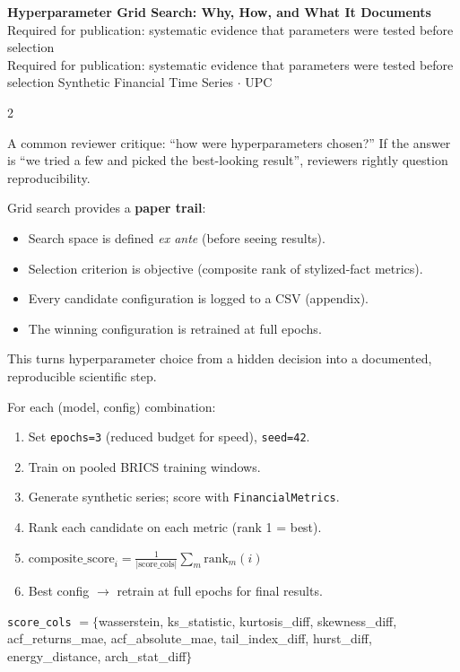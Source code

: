 \documentclass[10pt]{article}
\newcommand{\navybox}[2]{\begin{tcolorbox}[mybox={Navy}{LBg},title={#1}]#2\end{tcolorbox}}
\newcommand{\skybox}[2]{\begin{tcolorbox}[mybox={Sky}{BBg},title={#1}]#2\end{tcolorbox}}
\newcommand{\tealbox}[2]{\begin{tcolorbox}[mybox={Teal}{LBg},title={#1}]#2\end{tcolorbox}}
\newcommand{\pagehead}[2]{%
  \begin{tcolorbox}[enhanced,arc=0pt,outer arc=0pt,boxrule=0pt,
    colback=Navy,colframe=Navy,
    top=5pt,bottom=5pt,left=8pt,right=8pt,
    before skip=0pt,after skip=10pt]
  {\color{white}\large\bfseries #1}%
  \ifx\relax#2\relax\else\\[1pt]{\color{blue!30!white}\small #2}\fi
  \hfill{\color{blue!20!white}\footnotesize Synthetic Financial Time Series $\cdot$ UPC}
  \end{tcolorbox}}
\begin{document}
\clearpage

\pagehead{Hyperparameter Grid Search: Why, How, and What It Documents}
         {Required for publication: systematic evidence that parameters were tested before selection}

\begin{multicols}{2}

\navybox{Why Grid Search is Required for Publication}{%
A common reviewer critique: ``how were hyperparameters chosen?'' If the answer is ``we tried a few and picked the best-looking result'', reviewers rightly question reproducibility.

Grid search provides a \textbf{paper trail}:
\begin{itemize}
  \item Search space is defined \emph{ex ante} (before seeing results).
  \item Selection criterion is objective (composite rank of stylized-fact metrics).
  \item Every candidate configuration is logged to a CSV (appendix).
  \item The winning configuration is retrained at full epochs.
\end{itemize}
This turns hyperparameter choice from a hidden decision into a documented, reproducible scientific step.}

\skybox{The Search Protocol}{%
For each (model, config) combination:
\begin{enumerate}
  \item Set \texttt{epochs=3} (reduced budget for speed), \texttt{seed=42}.
  \item Train on pooled BRICS training windows.
  \item Generate synthetic series; score with \texttt{FinancialMetrics}.
  \item Rank each candidate on each metric (rank 1 = best).
  \item $\text{composite\_score}_i = \frac{1}{|\text{score\_cols}|} \sum_m \text{rank}_m(i)$
  \item Best config $\to$ retrain at full epochs for final results.
\end{enumerate}}

\tealbox{Composite Scoring Formula}{%
\texttt{score\_cols} $= \{$wasserstein, ks\_statistic, kurtosis\_diff, skewness\_diff, acf\_returns\_mae, acf\_absolute\_mae, tail\_index\_diff, hurst\_diff, energy\_distance, arch\_stat\_diff$\}$

}
\end{multicols}
\end{document}

